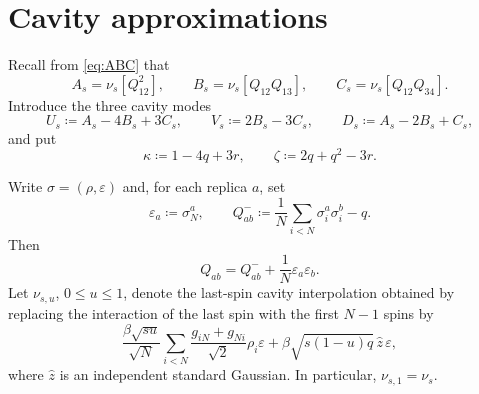 \documentclass[11pt]{article}
\numberwithin{equation}{section}
\newcommand{\1}{\mathbf 1}
\begin{document}
\section{Cavity approximations}
\label{app:cavity-identities}

Recall from \eqref{eq:ABC} that
\[
 A_s=\nu_s[Q_{12}^2],\qquad
 B_s=\nu_s[Q_{12}Q_{13}],\qquad
 C_s=\nu_s[Q_{12}Q_{34}].
\]
Introduce the three cavity modes
\begin{equation}
 U_s\coloneqq A_s-4B_s+3C_s,\qquad
 V_s\coloneqq2B_s-3C_s,\qquad
 D_s\coloneqq A_s-2B_s+C_s,
 \label{eq:cavity-modes}
\end{equation}
and put
\begin{equation}
 \kappa\coloneqq1-4q+3r,
 \qquad
 \zeta\coloneqq2q+q^2-3r.
 \label{eq:cavity-parameters}
\end{equation}

Write $\sigma=(\rho,\varepsilon)$ and, for each replica $a$, set
\[
 \varepsilon_a\coloneqq\sigma_N^a,
 \qquad
 Q^-_{ab}\coloneqq\frac1N\sum_{i<N}\sigma_i^a\sigma_i^b-q.
\]
Then
\begin{equation}
 Q_{ab}=Q^-_{ab}+\frac1N\varepsilon_a\varepsilon_b.
 \label{eq:Qab}
\end{equation}
Let $\nu_{s,u}$, $0\le u\le1$, denote the last-spin cavity
interpolation obtained by replacing the interaction of the last spin with
the first $N-1$ spins by
\[
 \frac{\beta\sqrt{su}}{\sqrt N}
 \sum_{i<N}\frac{g_{iN}+g_{Ni}}{\sqrt2}\rho_i\varepsilon
 +\beta\sqrt{s(1-u)q}\,\widehat z\,\varepsilon,
\]
where $\widehat z$ is an independent standard Gaussian.  In particular,
$\nu_{s,1}=\nu_s$.
\end{document}

